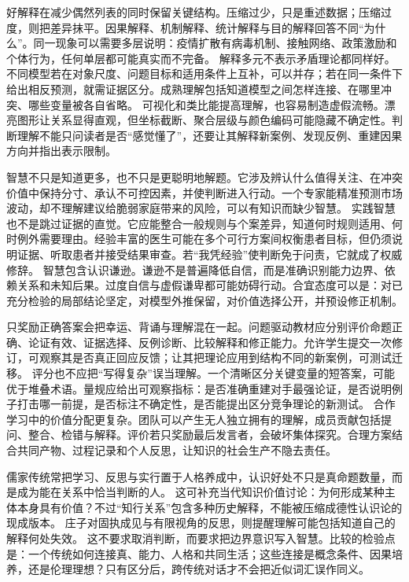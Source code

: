 好解释在减少偶然列表的同时保留关键结构。压缩过少，只是重述数据；压缩过度，则把差异抹平。因果解释、机制解释、统计解释与目的解释回答不同“为什么”。同一现象可以需要多层说明：疫情扩散有病毒机制、接触网络、政策激励和个体行为，任何单层都可能真实而不完备。 解释多元不表示矛盾理论都同样好。不同模型若在对象尺度、问题目标和适用条件上互补，可以并存；若在同一条件下给出相反预测，就需证据区分。成熟理解包括知道模型之间怎样连接、在哪里冲突、哪些变量被各自省略。 可视化和类比能提高理解，也容易制造虚假流畅。漂亮图形让关系显得直观，但坐标截断、聚合层级与颜色编码可能隐藏不确定性。判断理解不能只问读者是否“感觉懂了”，还要让其解释新案例、发现反例、重建因果方向并指出表示限制。

智慧不只是知道更多，也不只是更聪明地解题。它涉及辨认什么值得关注、在冲突价值中保持分寸、承认不可控因素，并使判断进入行动。一个专家能精准预测市场波动，却不理解建议给脆弱家庭带来的风险，可以有知识而缺少智慧。 实践智慧也不是跳过证据的直觉。它应能整合一般规则与个案差异，知道何时规则适用、何时例外需要理由。经验丰富的医生可能在多个可行方案间权衡患者目标，但仍须说明证据、听取患者并接受结果审查。若“我凭经验”使判断免于问责，它就成了权威修辞。 智慧包含认识谦逊。谦逊不是普遍降低自信，而是准确识别能力边界、依赖关系和未知后果。过度自信与虚假谦卑都可能妨碍行动。合宜态度可以是：对已充分检验的局部结论坚定，对模型外推保留，对价值选择公开，并预设修正机制。

只奖励正确答案会把幸运、背诵与理解混在一起。问题驱动教材应分别评价命题正确、论证有效、证据选择、反例诊断、比较解释和修正能力。允许学生提交一次修订，可观察其是否真正回应反馈；让其把理论应用到结构不同的新案例，可测试迁移。 评分也不应把“写得复杂”误当理解。一个清晰区分关键变量的短答案，可能优于堆叠术语。量规应给出可观察指标：是否准确重建对手最强论证，是否说明例子打击哪一前提，是否标注不确定性，是否能提出区分竞争理论的新测试。 合作学习中的价值分配更复杂。团队可以产生无人独立拥有的理解，成员贡献包括提问、整合、检错与解释。评价若只奖励最后发言者，会破坏集体探究。合理方案结合共同产物、过程记录和个人反思，让知识的社会生产不隐去责任。

儒家传统常把学习、反思与实行置于人格养成中，认识好处不只是真命题数量，而是成为能在关系中恰当判断的人。\parencite{analects2003,xunzi2014} 这可补充当代知识价值讨论：为何形成某种主体本身具有价值？不过“知行关系”包含多种历史解释，不能被压缩成德性认识论的现成版本。 庄子对固执成见与有限视角的反思，则提醒理解可能包括知道自己的解释何处失效。\parencite{zhuangzi2009} 这不要求取消判断，而要求把边界意识写入智慧。比较的检验点是：一个传统如何连接真、能力、人格和共同生活；这些连接是概念条件、因果培养，还是伦理理想？只有区分后，跨传统对话才不会把近似词汇误作同义。

